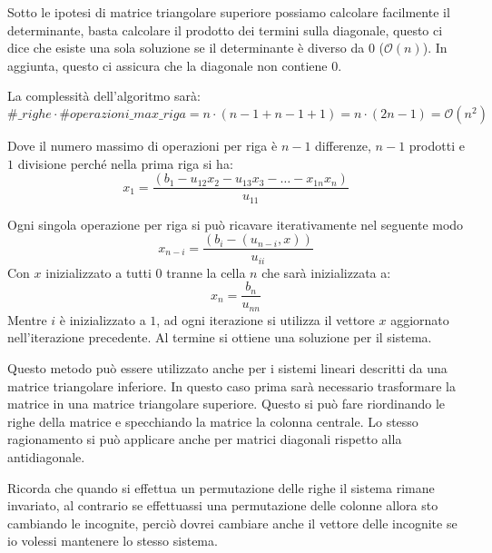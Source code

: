 Sotto le ipotesi di matrice triangolare superiore possiamo calcolare facilmente
il determinante, basta calcolare il prodotto dei termini sulla diagonale, questo
ci dice che esiste una sola soluzione se il determinante è diverso da $0$
($\mathcal{O}(n)$). In aggiunta, questo ci assicura che la diagonale non contiene $0$.

La complessità dell'algoritmo sarà:
\begin{equation*}
    \#\_righe \cdot \#operazioni\_max\_riga = n \cdot (n - 1 + n - 1 + 1) = n \cdot (2n - 1) = \mathcal{O}(n^2)
\end{equation*}
\begin{nota}
    Dove il numero massimo di operazioni per riga è $n - 1$ differenze, $n - 1$
    prodotti e $1$ divisione perché nella prima riga si ha:
    \begin{equation*}
        x_1 = \frac{(b_1 - u_{12} x_2 - u_{13}x_3 - \dots - x_{1n} x_n)}{u_{11}}
    \end{equation*}
\end{nota}

Ogni singola operazione per riga si può ricavare iterativamente nel seguente modo
\begin{equation*}
    x_{n-i} = \frac{(b_i-(u_{n-i},x))}{u_{ii}}
\end{equation*}
Con $x$ inizializzato a tutti $0$ tranne la cella $n$ che sarà inizializzata a:
\begin{equation*}
    x_n = \frac{b_n}{u_{nn}}
\end{equation*}
Mentre $i$ è inizializzato a $1$, ad ogni iterazione si utilizza il vettore $x$
aggiornato nell'iterazione precedente. Al termine si ottiene una soluzione per il
sistema.
\begin{nota}
    Questo metodo può essere utilizzato anche per i sistemi lineari descritti da
    una matrice triangolare inferiore. In questo caso prima sarà necessario
    trasformare la matrice in una matrice triangolare superiore. Questo si può
    fare riordinando le righe della matrice e specchiando la matrice la colonna
    centrale. Lo stesso ragionamento si può applicare anche per matrici diagonali
    rispetto alla antidiagonale.
\end{nota}
\begin{nota}
    Ricorda che quando si effettua un permutazione delle righe il sistema rimane
    invariato, al contrario se effettuassi una permutazione delle colonne allora 
    sto cambiando le incognite, perciò dovrei cambiare anche il vettore delle incognite
    se io volessi mantenere lo stesso sistema.
\end{nota}
